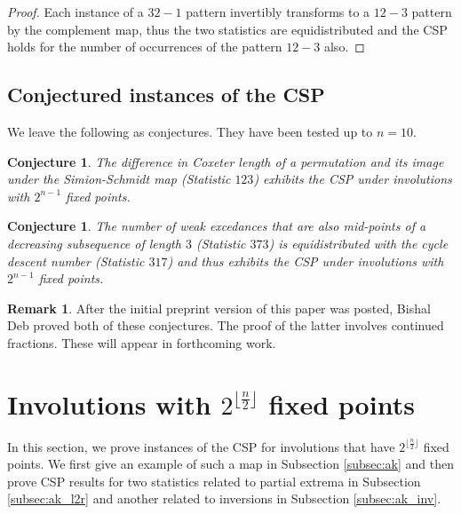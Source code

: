 \documentclass{amsart}
\newtheorem{conj}[thm]{Conjecture}
\theoremstyle{definition}
\newtheorem{remark}[thm]{Remark}
\begin{document}
\begin{proof}
    Each instance of a $32-1$ pattern invertibly transforms to a $12-3$ pattern by the complement map, thus the two statistics are equidistributed and the CSP holds for the number of occurrences of the pattern $12-3$ also.
\end{proof}

\subsection{Conjectured instances of the CSP}
We leave the following as conjectures. They have been tested up to $n=10$.

\begin{conj}\label{conj:123}
  The difference in Coxeter length of a permutation and its image under the Simion-Schmidt map (Statistic $123$) exhibits the CSP under involutions with $2^{n-1}$ fixed points.
\end{conj}

\begin{conj}\label{conj:373}
  The number of weak excedances that are also mid-points of a decreasing subsequence of length $3$ (Statistic $373$) is equidistributed with the cycle descent number (Statistic $317$) and thus exhibits the CSP under involutions with $2^{n-1}$ fixed points.
\end{conj}

\begin{remark}
After the initial preprint version of this paper was posted, Bishal Deb proved both of these conjectures. The proof of the latter involves continued fractions. These will appear in forthcoming work.
\end{remark}







\section{Involutions with $2^{\lfloor\frac{n}{2}\rfloor}$ fixed points}
\label{sec:alex-k}
In this section, we prove instances of the CSP for involutions that have $2^{\lfloor\frac{n}{2}\rfloor}$ fixed points. We first give an example of such a map in Subsection \ref{subsec:ak} and  then prove CSP results for two  statistics related to partial extrema in Subsection \ref{subsec:ak_l2r} and another related to inversions in Subsection \ref{subsec:ak_inv}.
\end{document}
